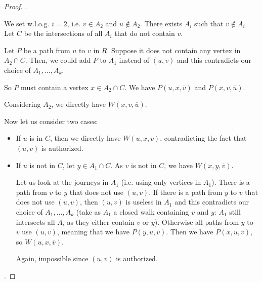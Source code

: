 \documentclass[10pt,a4paper]{amsart}
\begin{document}
\begin{proof}
.

We set w.l.o.g. $i=2$, i.e. $v\in A_2$ and $u\not\in A_2$. There exists $A_i$ such that $v\not\in A_i$. Let $C$ be the intersections of all $A_i$ that do not contain $v$. 

Let $P$ be a path from $u$ to $v$ in $R$. Suppose it does not contain any vertex in $A_2\cap C$. Then, we could add $P$ to $A_1$ instead of $(u,v)$ and this contradicts our choice of $A_1,\dots, A_k$.  

So $P$ must contain a vertex $x\in A_2\cap C$. We have $P(u,x,\overline{v})$ and $P(x,v,\overline{u})$.

Considering $A_2$, we directly have $W(x,v,\overline{u})$. 

Now let us consider two cases:
\begin{itemize}
	\item If $u$ is in $C$, then we directly have $W(u,x,\overline{v})$, contradicting the fact that $(u,v)$ is authorized.
	\item If $u$ is not in $C$,
 let $y\in A_1\cap C$. As $v$ is not in $C$, we have $W(x,y,\overline{v})$. 

Let us look at the journeys in $A_1$ (i.e. using only vertices in $A_1$). There is a path from $v$ to $y$ that does not use $(u,v)$. If there is a path from $y$ to $v$ that does not use $(u,v)$, then $(u,v)$ is useless in $A_1$ and this contradicts our choice of $A_1,\dots, A_k$ (take as $A_1$ a closed walk containing $v$ and $y$: $A_1$ still intersects all $A_i$ as they either contain $v$ or $y$). Otherwise all paths from $y$ to $v$ use $(u,v)$, meaning that we have $P(y,u,\overline{v})$. Then we have  $P(x,u,\overline{v})$, so $W(u,x,\overline{v})$.

Again, impossible since $(u,v)$ is authorized.\\
\end{itemize}


.


\end{proof}
\end{document}
